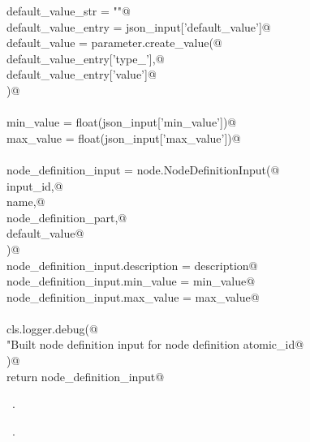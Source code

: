 \documentclass[
    a4paper,      %
    10pt,         %
    openright,    %
    notitlepage,  %
    parskip=half, %
]{scrreprt}       %
\theoremstyle{definition}                    %
\begin{document}
\begin{flushleft}
\begin{minipage}{\linewidth}
\begin{list}{}{}
\mbox{}\lstinline@    default_value_str = ""@\\
\mbox{}\lstinline@    default_value_entry = json_input['default_value']@\\
\mbox{}\lstinline@    default_value = parameter.create_value(@\\
\mbox{}\lstinline@        default_value_entry['type_'],@\\
\mbox{}\lstinline@        default_value_entry['value']@\\
\mbox{}\lstinline@    )@\\
\mbox{}\lstinline@@\\
\mbox{}\lstinline@    min_value = float(json_input['min_value'])@\\
\mbox{}\lstinline@    max_value = float(json_input['max_value'])@\\
\mbox{}\lstinline@@\\
\mbox{}\lstinline@    node_definition_input = node.NodeDefinitionInput(@\\
\mbox{}\lstinline@        input_id,@\\
\mbox{}\lstinline@        name,@\\
\mbox{}\lstinline@        node_definition_part,@\\
\mbox{}\lstinline@        default_value@\\
\mbox{}\lstinline@    )@\\
\mbox{}\lstinline@    node_definition_input.description = description@\\
\mbox{}\lstinline@    node_definition_input.min_value = min_value@\\
\mbox{}\lstinline@    node_definition_input.max_value = max_value@\\
\mbox{}\lstinline@@\\
\mbox{}\lstinline@    cls.logger.debug(@\\
\mbox{}\lstinline@        "Built node definition input for node definition %s",@\\
\mbox{}\lstinline@        atomic_id@\\
\mbox{}\lstinline@    )@\\
\mbox{}\lstinline@    return node_definition_input@\\
\mbox{}\lstinline@@{\NWsep}
\end{list}
\vspace{-1.5ex}
\footnotesize
\begin{list}{}{\setlength{\itemsep}{-\parsep}\setlength{\itemindent}{-\leftmargin}}
\item \NWtxtMacroDefBy\ .
\item \NWtxtMacroRefIn\ .

\item{}
\end{list}
\end{minipage}\vspace{4ex}
\end{flushleft}
\end{document}
